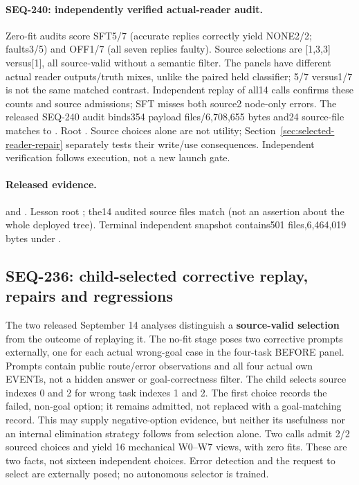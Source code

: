 \documentclass{article}
\begin{document}
\paragraph{SEQ-240: independently verified actual-reader audit.}
Zero-fit audits score SFT5/7 (accurate replies correctly yield NONE2/2;
faults3/5) and OFF1/7 (all seven replies faulty). Source selections are
[1,3,3] versus[1], all source-valid without a semantic filter. The panels have
different actual reader outputs/truth mixes, unlike the paired held classifier;
5/7 versus1/7 is not the same matched contrast. Independent replay of all14
calls confirms these counts and source admissions; SFT misses both source2
node-only errors. The released SEQ-240 audit
binds354 payload files/6,708,655 bytes and24 source-file matches to
. Root
. Source choices alone are
not utility; Section~\ref{sec:selected-reader-repair} separately tests their
write/use consequences. Independent verification follows execution, not a new
launch gate.

\paragraph{Released evidence.}
 and
.
Lesson root ; the14 audited
source files match 
(not an assertion about the whole deployed tree). Terminal independent snapshot
contains501 files,6,464,019 bytes under
.

\subsection{SEQ-236: child-selected corrective replay, repairs and regressions}
\label{sec:corrective-replay}

The two released September 14 analyses distinguish a \textbf{source-valid selection}
from the outcome of replaying it. The no-fit stage poses two corrective prompts
externally, one for each actual wrong-goal case in the four-task BEFORE panel.
Prompts contain public route/error observations and all four actual own EVENTs,
not a hidden answer or goal-correctness filter. The child selects source indexes
0 and 2 for wrong task indexes 1 and 2. The first choice records the failed,
non-goal option; it remains admitted, not replaced with a goal-matching record.
This may supply negative-option evidence, but neither its usefulness nor an
internal elimination strategy follows from selection alone. Two calls admit
2/2 sourced choices and yield 16 mechanical W0--W7 views, with zero fits.
These are two facts, not sixteen independent choices. Error detection and the
request to select are externally posed; no autonomous selector is trained.
\end{document}
